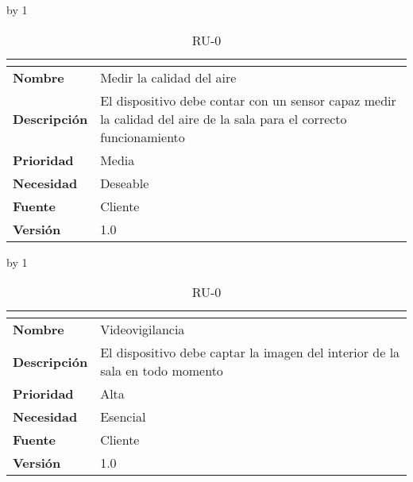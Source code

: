 \advance\ru by 1
\begin{table}[H]
	\caption{RU-0\number\ru}
	\begin{tabular}{|l|p{}|}
		\hline
		\multicolumn{2}{|c|}{\cellcolor[HTML]{BFBFBF}{\color[HTML]{000000} \textbf{RU-0\number\ru}}} \\ \hline
		\textbf{Nombre}      & Medir la calidad del aire                                                                                           \\ \hline
		\textbf{Descripción} & El dispositivo debe contar con un sensor capaz medir la calidad del aire de la sala para el correcto funcionamiento \\ \hline
		\textbf{Prioridad}   & Media                                                                                                               \\ \hline
		\textbf{Necesidad}   & Deseable                                                                                                            \\ \hline
		\textbf{Fuente}      & Cliente                                                                                                             \\ \hline
		\textbf{Versión}     & 1.0                                                                                                                 \\ \hline
	\end{tabular}
\end{table}
\advance\ru by 1
\begin{table}[H]
	\caption{RU-0\number\ru}
	\begin{tabular}{|l|p{}|}
		\hline
		\multicolumn{2}{|c|}{\cellcolor[HTML]{BFBFBF}{\color[HTML]{000000} \textbf{RU-0\number\ru}}} \\ \hline
		\textbf{Nombre}      & Videovigilancia                                                              \\ \hline
		\textbf{Descripción} & El dispositivo debe captar la imagen del interior de la sala en todo momento \\ \hline
		\textbf{Prioridad}   & Alta                                                                         \\ \hline
		\textbf{Necesidad}   & Esencial                                                                     \\ \hline
		\textbf{Fuente}      & Cliente                                                                      \\ \hline
		\textbf{Versión}     & 1.0                                                                          \\ \hline
	\end{tabular}
\end{table}
